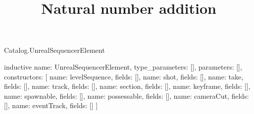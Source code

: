 \begin{lexlean}{Catalog.UnrealSequencerElement}
\title{Natural number addition}
\begin{semanticmodule}
inductive{
  name: UnrealSequencerElement,
  type_parameters: [],
  parameters: [],
  constructors: [
    {name: levelSequence, fields: []},
    {name: shot, fields: []},
    {name: take, fields: []},
    {name: track, fields: []},
    {name: section, fields: []},
    {name: keyframe, fields: []},
    {name: spawnable, fields: []},
    {name: possessable, fields: []},
    {name: cameraCut, fields: []},
    {name: eventTrack, fields: []}
  ]
}
\end{semanticmodule}
\end{lexlean}
